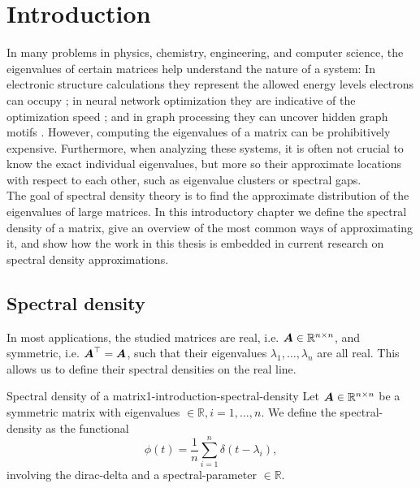 \chapter{Introduction}
\label{chp:1-introduction}

In many problems in physics, chemistry, engineering, and computer science, 
the eigenvalues of certain matrices help understand the nature of a system:
In electronic structure calculations they represent the allowed energy levels 
electrons can occupy \cite{ducastelle1970charge, haydock1972electronic, lin2017randomized};
in neural network optimization they are indicative of the optimization speed \cite{ghorbani2019investigation,chen2021slq,adepu2021hessian};
and in graph processing they can uncover hidden graph motifs \cite{kruzick2018graph,huang2021kernels,patane2022filter}.
However, computing the eigenvalues of a matrix can be prohibitively expensive.
Furthermore, when analyzing these systems, it is often not crucial to know the
exact individual eigenvalues, but more so their approximate locations with respect
to each other, such as eigenvalue clusters or spectral gaps.\\

The goal of spectral density theory is to find the approximate distribution of
the eigenvalues of large matrices. In this introductory chapter we define the
spectral density of a matrix, give an overview of the most common ways of
approximating it, and show how the work in this thesis is embedded in current
research on spectral density approximations.

\section{Spectral density}
\label{sec:1-introduction-spectral-density}

In most applications, the studied matrices are real,
i.e. $\boldsymbol{A} \in \mathbb{R}^{n \times n}$, and symmetric, i.e. $\boldsymbol{A}^{\top} = \boldsymbol{A}$,
such that their eigenvalues $\lambda_1, \dots, \lambda_n$ are all real.
This allows us to define their spectral densities on the real line.
\begin{definition}{Spectral density of a matrix}{1-introduction-spectral-density}
    Let $\boldsymbol{A} \in \mathbb{R}^{n \times n}$ be a symmetric matrix with \glspl{eigenvalue}
    $\in \mathbb{R}, i=1, \dots, n$. We define the \gls{spectral-density} as
    the functional
    \begin{equation}
        \phi(t) = \frac{1}{n} \sum_{i=1}^{n} \delta(t - \lambda_i),
        \label{equ:1-introduction-def-spectral-density}
    \end{equation}
    involving the \gls{dirac-delta}
    and a \gls{spectral-parameter} $\in \mathbb{R}$.
\end{definition}

